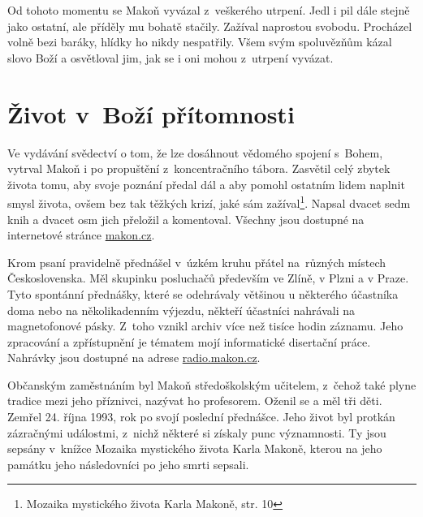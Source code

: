 Od tohoto momentu se Makoň vyvázal z~veškerého utrpení. Jedl i pil dále stejně
jako ostatní, ale příděly mu bohatě stačily. Zažíval naprostou svobodu.
Procházel volně bezi baráky, hlídky ho nikdy nespatřily. Všem svým spoluvězňům
kázal slovo Boží a osvětloval jim, jak se i oni mohou z~utrpení
vyvázat.

\section{Život v~Boží přítomnosti}

Ve vydávání svědectví o tom, že lze dosáhnout vědomého spojení s~Bohem, vytrval
Makoň i po propuštění z~koncentračního tábora. Zasvětil celý zbytek života tomu,
aby svoje poznání předal dál a aby pomohl ostatním lidem
naplnit smysl života, ovšem bez tak těžkých krizí, jaké sám
zažíval\footnote{Mozaika mystického života Karla Makoně, str. 10}. Napsal
dvacet sedm knih a dvacet osm jich přeložil a komentoval. Všechny jsou dostupné
na internetové stránce \href{http://makon.cz/}{makon.cz}.

Krom psaní pravidelně přednášel v~úzkém kruhu přátel na~různých místech
Československa. Měl skupinku posluchačů především ve Zlíně, v Plzni a v Praze.
Tyto spontánní přednášky, které se odehrávaly většinou u některého účastníka
doma nebo na několikadenním výjezdu, někteří účastníci nahrávali na
magnetofonové pásky. Z~toho vznikl archiv více než tisíce hodin záznamu. Jeho
zpracování a zpřístupnění je tématem mojí informatické disertační
práce\cite{kruuza2021iterativni}. Nahrávky jsou dostupné na adrese
\href{http://radio.makon.cz/}{radio.makon.cz}.

Občanským zaměstnáním byl Makoň středoškolským učitelem, z~čehož také plyne
tradice mezi jeho příznivci, nazývat ho profesorem. Oženil se a měl tři děti.
Zemřel 24. října 1993, rok po svojí poslední přednášce. Jeho život byl protkán
zázračnými událostmi, z~nichž některé si získaly punc významnosti. Ty jsou
sepsány v~knížce Mozaika mystického života Karla Makoně\cite{kaliban2002mozaika}, kterou na
jeho památku jeho následovníci po jeho smrti sepsali.


